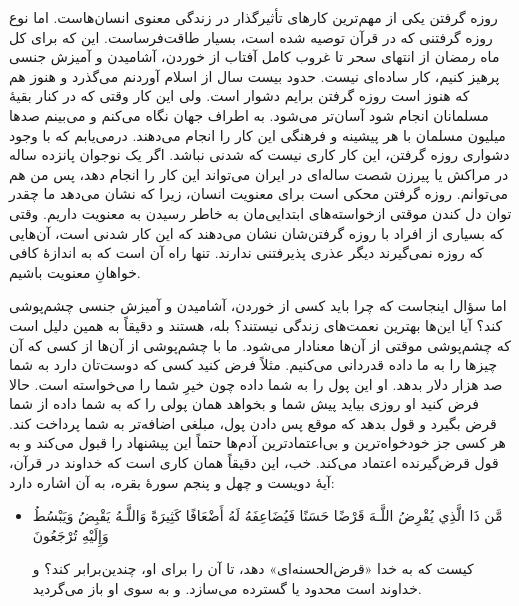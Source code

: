 روزه گرفتن یکی از مهم‌ترین کارهای تأثیرگذار در زندگی معنوی انسان‌هاست. اما نوع روزه گرفتنی که در قرآن توصیه شده است، بسیار طاقت‌فرساست. این که برای کل ماه رمضان از انتهای سحر تا غروب کامل آفتاب از خوردن، آشامیدن و آمیزش جنسی پرهیز کنیم، کار ساده‌ای نیست. حدود بیست سال از اسلام آوردنم می‌گذرد و هنوز هم که هنوز است روزه گرفتن برایم دشوار است. ولی این کار وقتی که در کنار بقیهٔ مسلمانان انجام شود آسان‌تر ‌‌می‌شود. به اطراف جهان نگاه ‌می‌کنم و ‌‌می‌بینم صدها میلیون مسلمان با هر پیشینه و فرهنگی این کار را انجام می‌دهند. درمی‌یابم که  با وجود دشواری روزه گرفتن،  این کار کاری نیست که شدنی نباشد. اگر یک نوجوان پانزده ساله در مراکش یا پیرزن شصت ساله‌ای در ایران می‌تواند این کار را انجام دهد، پس من هم می‌توانم. روزه گرفتن محکی است برای معنویت انسان، زیرا که نشان می‌دهد  ما چقدر توان  دل کندن موقتی  ازخواسته‌های ابتدایی‌مان به خاطر رسیدن به معنویت داریم. وقتی که بسیاری از افراد با روزه گرفتن‌شان نشان می‌دهند که این کار شدنی است، آن‌هایی که روزه نمی‌گیرند دیگر عذری پذیرفتنی ندارند. تنها راه آن است که به اندازهٔ کافی خواهانِ معنویت باشیم.


اما سؤال اینجاست که چرا باید کسی از خوردن، آشامیدن و آمیزش جنسی چشم‌پوشی کند؟ آیا این‌ها بهترین نعمت‌های زندگی نیستند؟ بله، هستند و دقیقاً به همین دلیل است که چشم‌پوشی موقتی از آن‌ها معنادار می‌شود. ما با چشم‌پوشی از آن‌ها از کسی که آن چیزها را به ما داده قدردانی می‌کنیم. مثلاً فرض کنید کسی که دوست‌تان دارد به شما صد هزار دلار بدهد. او این پول را به شما داده چون خیرِ شما را می‌خواسته است. حالا فرض کنید او روزی بیاید پیش شما و بخواهد همان پولی را که به شما داده از شما قرض بگیرد و قول بدهد که موقع پس دادن پول، مبلغی اضافه‌تر به شما پرداخت کند. هر کسی جز خودخواه‌ترین و بی‌اعتمادترین آدم‌ها حتماً این پیشنهاد را قبول می‌کند و به قول قرض‌گیرنده اعتماد می‌کند. خب، این دقیقاً همان کاری است که خداوند در قرآن، آیهٔ دویست و چهل و پنجم سورهٔ بقره، به آن اشاره دارد:

\begin{itemize}
	\item[]
	{
		مَّن ذَا الَّذِي يُقْرِضُ اللَّـهَ قَرْضًا حَسَنًا فَيُضَاعِفَهُ لَهُ أَضْعَافًا كَثِيرَةً  وَاللَّـهُ يَقْبِضُ وَيَبْسُطُ وَإِلَيْهِ تُرْجَعُونَ}
	
	{
		کیست که به خدا «قرض‌الحسنه‌ای» دهد،  تا آن را برای او، چندین‌برابر کند؟ و خداوند است محدود یا گسترده می‌سازد. و به سوی او باز می‌گردید.}
\end{itemize}

